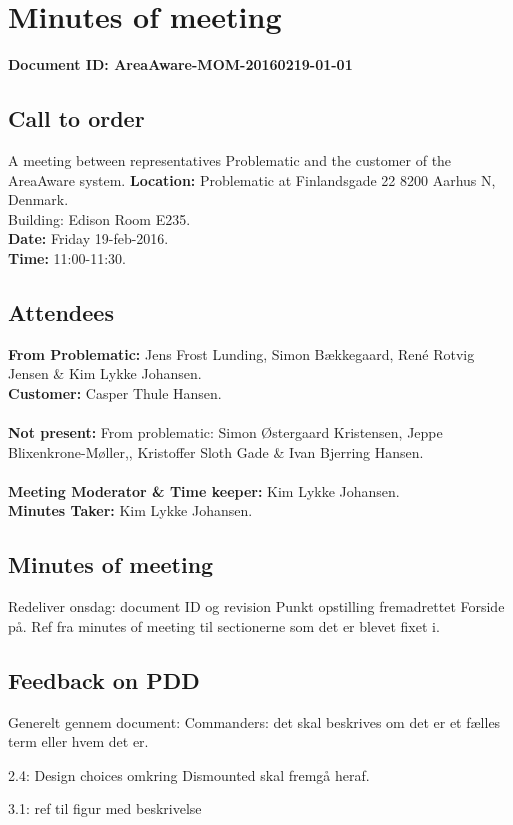 %
\thispagestyle{fancy}
\chapter*{Minutes of meeting}
\textbf{Document ID: AreaAware-MOM-20160219-01-01}


\section*{Call to order}
A meeting between representatives Problematic and the customer of the AreaAware system.
\textbf{Location:} Problematic at Finlandsgade 22 8200 Aarhus N, Denmark.\\ Building: Edison Room E235.\\
\textbf{Date:} Friday 19-feb-2016. \\
\textbf{Time:} 11:00-11:30.
\section*{Attendees}
\textbf{From Problematic:} Jens Frost Lunding, Simon Bækkegaard, René Rotvig Jensen \& Kim Lykke Johansen.\\
\textbf{Customer:} Casper Thule Hansen.\\\\
\textbf{Not present:} From problematic: Simon Østergaard Kristensen, Jeppe Blixenkrone-Møller,, Kristoffer Sloth Gade \& Ivan Bjerring Hansen.\\\\
\textbf{Meeting Moderator \& Time keeper:} Kim Lykke Johansen. \\
\textbf{Minutes Taker:} Kim Lykke Johansen.

\section*{Minutes of meeting}
Redeliver onsdag: document ID og revision
Punkt opstilling fremadrettet
Forside på.
Ref fra minutes of meeting til sectionerne som det er blevet fixet i.

\section*{Feedback on PDD}
Generelt gennem document: Commanders: det skal beskrives om det er et fælles term eller hvem det er.

2.4: Design choices omkring Dismounted skal fremgå heraf.

3.1: ref til figur med beskrivelse

